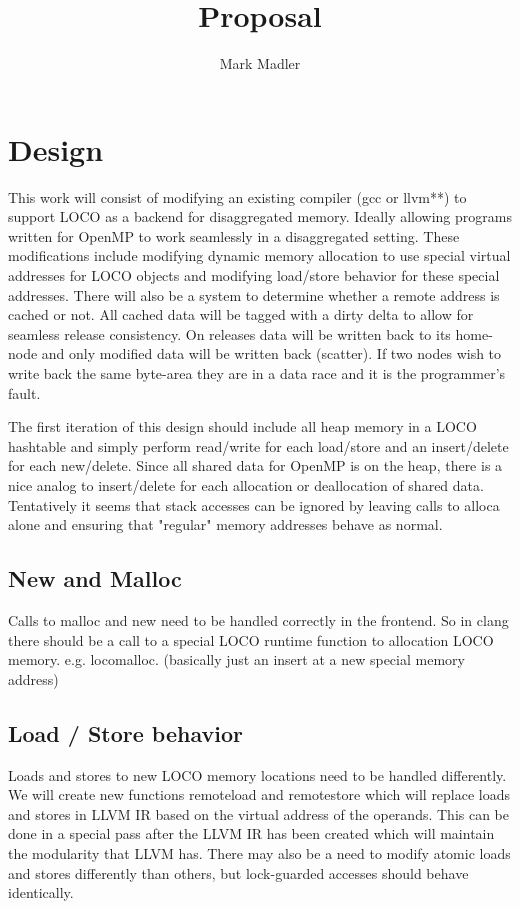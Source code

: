 \documentclass[sigplan,nonacm]{acmart}
\title{Proposal}
\author{Mark Madler}
\begin{document}
\maketitle

\section{Design}
This work will consist of modifying an existing compiler (gcc or llvm**) to 
support LOCO as a backend for disaggregated memory. Ideally allowing programs 
written for OpenMP to work seamlessly in a disaggregated setting.
These modifications include modifying dynamic memory allocation to use special 
virtual addresses for LOCO objects and modifying load/store behavior for these 
special addresses. 
There will also be a system to determine whether a remote address is cached or not.
All cached data will be tagged with a dirty delta to allow for seamless release consistency. 
On releases data will be written back to its home-node and only modified data will be written back 
(scatter). If two nodes wish to write back the same byte-area they are in a data race 
and it is the programmer's fault. 

The first iteration of this design should include all heap memory in a LOCO hashtable and
simply perform read/write for each load/store and an insert/delete for each new/delete. 
Since all shared data for OpenMP is on the heap, there is a nice analog to insert/delete 
for each allocation or deallocation of shared data. Tentatively it seems that stack
accesses can be ignored by leaving calls to alloca alone and ensuring that "regular" 
memory addresses behave as normal.

\subsection{New and Malloc}
Calls to malloc and new need to be handled correctly in the frontend. So in clang
there should be a call to a special LOCO runtime function to allocation LOCO memory.
e.g. locomalloc. (basically just an insert at a new special memory address)


\subsection{Load / Store behavior}
Loads and stores to new LOCO memory locations need to be handled differently. 
We will create new functions remoteload and remotestore which will replace
loads and stores in LLVM IR based on the virtual address of the operands.
This can be done in a special pass after the LLVM IR has been created which will maintain the 
modularity that LLVM has. There may also be a need to modify atomic loads and stores 
differently than others, but lock-guarded accesses should behave identically.
\end{document}
